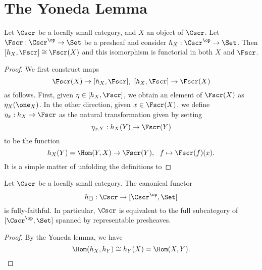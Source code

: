 \section{The Yoneda Lemma}

\begin{theorem}
  Let $\Cscr$ be a locally small category, and $X$ an object of $\Cscr$.
  Let $\Fscr : \Cscr^{\op} \to \Set$ be a presheaf and consider $h_{X} : \Cscr^{\op} \to \Set$.
  Then $[h_{X},\Fscr] \cong \Fscr(X)$ and this isomorphism is functorial in both $X$ and $\Fscr$.
\end{theorem}
\begin{proof}
  We first construct maps
  \[ \Fscr(X) \to [h_{X},\Fscr], \ [h_{X},\Fscr] \to \Fscr(X) \]
  as follows.
  First, given $\eta \in [h_{X},\Fscr]$, we obtain an element of $\Fscr(X)$ as $\eta_{X}(\one_{X})$.
  In the other direction, given $x \in \Fscr(X)$, we define $\eta_{x} : h_{X} \to \Fscr$ as the natural transformation given by setting
  \[ \eta_{x,Y} : h_{X}(Y) \to \Fscr(Y) \]
  to be the function
  \[ h_{X}(Y) = \Hom(Y,X) \to \Fscr(Y), \ \ f \mapsto \Fscr(f)(x). \]
  It is a simple matter of unfolding the definitions to 
\end{proof}

\begin{corollary}
  Let $\Cscr$ be a locally small category.
  The canonical functor
  \[ h_{\square} : \Cscr \to [\Cscr^{\op},\Set] \]
  is fully-faithful.
  In particular, $\Cscr$ is equivalent to the full subcategory of $[\Cscr^{\op},\Set]$ spanned by representable presheaves.
\end{corollary}
\begin{proof}
  By the Yoneda lemma, we have
  \[ \Hom(h_{X},h_{Y}) \cong h_{Y}(X) = \Hom(X,Y). \]
\end{proof}

